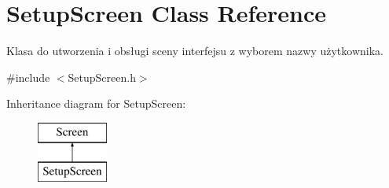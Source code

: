 \hypertarget{class_setup_screen}{}\section{Setup\+Screen Class Reference}
\label{class_setup_screen}


Klasa do utworzenia i obsługi sceny interfejsu z wyborem nazwy użytkownika.  




{\ttfamily \#include $<$Setup\+Screen.\+h$>$}

Inheritance diagram for Setup\+Screen\+:\begin{figure}[H]
\begin{center}
\leavevmode
\includegraphics[height=2.000000cm]{class_setup_screen}
\end{center}
\end{figure}

